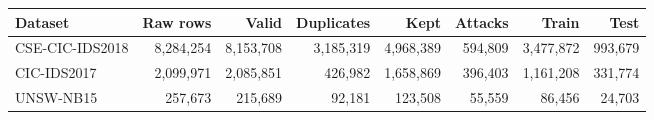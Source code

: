 \begin{tabular}{@{}lrrrrrrr@{}}
\toprule
\textbf{Dataset} & \textbf{Raw rows} & \textbf{Valid} & \textbf{Duplicates} & \textbf{Kept} & \textbf{Attacks} & \textbf{Train} & \textbf{Test} \\
\midrule
CSE-CIC-IDS2018 & 8,284,254 & 8,153,708 & 3,185,319 & 4,968,389 & 594,809 & 3,477,872 & 993,679 \\
CIC-IDS2017 & 2,099,971 & 2,085,851 & 426,982 & 1,658,869 & 396,403 & 1,161,208 & 331,774 \\
UNSW-NB15 & 257,673 & 215,689 & 92,181 & 123,508 & 55,559 & 86,456 & 24,703 \\
\bottomrule
\end{tabular}
